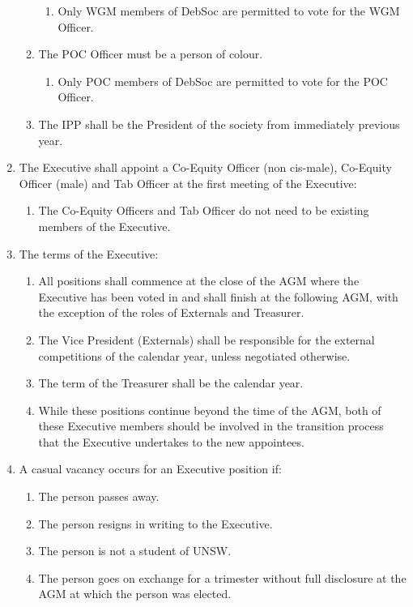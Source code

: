 \begin{enumerate}
\begin{enumerate}
    \begin{enumerate}
    \item Only WGM members of DebSoc are permitted to vote for the WGM Officer.
    \end{enumerate}
  \item The POC Officer must be a person of colour.
    \begin{enumerate}
    \item Only POC members of DebSoc are permitted to vote for the POC Officer.
    \end{enumerate}
  \item The IPP shall be the President of the society from immediately previous year. \label{ipp_desc}
  \end{enumerate}
\item The Executive shall appoint a Co-Equity Officer (non cis-male), Co-Equity Officer (male) and Tab Officer at the first meeting of the Executive:
  \begin{enumerate}
  \item The Co-Equity Officers and Tab Officer do not need to be existing members of the Executive.
  \end{enumerate}
\item The terms of the Executive:
  \begin{enumerate}
  \item All positions shall commence at the close of the AGM where the Executive has been voted in and shall finish at the following AGM, with the exception of the roles of Externals and Treasurer.
  \item The Vice President (Externals) shall be responsible for the external competitions of the calendar year, unless negotiated otherwise.
  \item The term of the Treasurer shall be the calendar year.
  \item While these positions continue beyond the time of the AGM, both of these Executive members should be involved in the transition process that the Executive undertakes to the new appointees.
  \end{enumerate}
\item A casual vacancy occurs for an Executive position if:
  \begin{enumerate}
  \item The person passes away.
  \item The person resigns in writing to the Executive.
  \item The person is not a student of UNSW.
  \item The person goes on exchange for a trimester without full disclosure at the AGM at which the person was elected.

\end{enumerate}
\end{enumerate}
